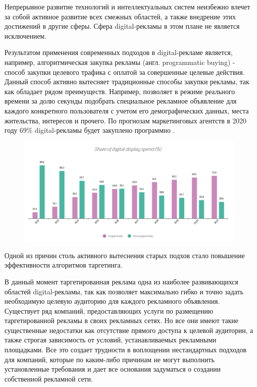 \documentclass[times]{itmo-student-thesis}
\begin{document}
\tableofcontents









\startprefacepage

Непрерывное развитие технологий и интеллектуальных систем неизбежно влечет за собой активное развитие всех смежных областей, а также внедрение этих достижений в другие сферы. Сфера digital-рекламы в этом плане не является исключением. 

Результатом применения современных подходов в digital-рекламе является, например, алгоритмическая закупка рекламы (англ. programmatic buying) \cite{programmatic-buying} - способ закупки целевого трафика с оплатой за совершенные целевые действия. Данный способ активно вытесняет традиционные способы закупки рекламы, так как обладает рядом преимуществ. Например, позволяет в режиме реального времени за долю секунды подобрать специальное рекламное объявление для каждого конкретного пользователя с учетом его демографических данных, места жительства, интересов и прочего. По прогнозам маркетинговых агентств в 2020 году 69\% digital-рекламы будет закуплено программно \cite{growth-of-programmatic}. 


\begin{figure}[h]
\includegraphics[width=\textwidth]{share-of-programmatic}
\centering
\end{figure}

Одной из причин столь активного вытеснения старых подхов стало повышение эффективности алгоритмов таргетинга. 

В данный момент таргетированная реклама одна из наиболее развивающихся областей digital-рекламы, так как позволяет максимально гибко и точно задать необходимую целевую аудиторию для каждого рекламного объявления. Существует ряд компаний, предоставляющих услуги по размещению таргетированной рекламы в своих рекламных сетях. Но все они имеют такие существенные недостатки как отсутствие прямого доступа к целевой аудитории, а также строгая зависимость от условий, устанавливаемых рекламными площадками. Все это создает трудности в воплощении нестандартных подходов для компаний, которые по каким-либо причинам не могут выполнить установленные требования и дает все основания задуматься о создании собственной рекламной сети.
\end{document}
